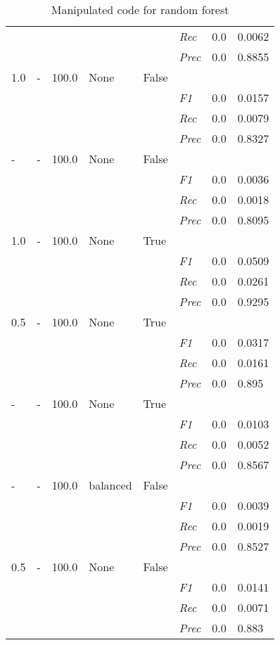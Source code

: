 \begin{table}[]
\begin{tabularx}{\textwidth}{XXXXX|X|X|X}
    & & & & & \textit{Rec} &  0.0 & 0.0062    \\
    & & & & & \textit{Prec} & 0.0 & 0.8855  \\ \midrule
    1.0 & - & 100.0 & None & False & &  \\
    & & & & & \textit{F1} & 0.0 & 0.0157        \\
    & & & & & \textit{Rec} &  0.0 & 0.0079    \\
    & & & & & \textit{Prec} & 0.0 & 0.8327  \\ \midrule
    - & - & 100.0 & None & False & &  \\
    & & & & & \textit{F1} & 0.0 & 0.0036        \\
    & & & & & \textit{Rec} &  0.0 & 0.0018    \\
    & & & & & \textit{Prec} & 0.0 & 0.8095  \\ \midrule
    1.0 & - & 100.0 & None & True & &  \\
    & & & & & \textit{F1} & 0.0 & 0.0509        \\
    & & & & & \textit{Rec} &  0.0 & 0.0261    \\
    & & & & & \textit{Prec} & 0.0 & 0.9295  \\ \midrule
    0.5 & - & 100.0 & None & True & &  \\
    & & & & & \textit{F1} & 0.0 & 0.0317        \\
    & & & & & \textit{Rec} &  0.0 & 0.0161    \\
    & & & & & \textit{Prec} & 0.0 & 0.895  \\ \midrule
    - & - & 100.0 & None & True & &  \\
    & & & & & \textit{F1} & 0.0 & 0.0103        \\
    & & & & & \textit{Rec} &  0.0 & 0.0052    \\
    & & & & & \textit{Prec} & 0.0 & 0.8567  \\ \midrule
    - & - & 100.0 & balanced & False & &  \\
    & & & & & \textit{F1} & 0.0 & 0.0039        \\
    & & & & & \textit{Rec} &  0.0 & 0.0019    \\
    & & & & & \textit{Prec} & 0.0 & 0.8527  \\ \midrule
    0.5 & - & 100.0 & None & False & &  \\
    & & & & & \textit{F1} & 0.0 & 0.0141        \\
    & & & & & \textit{Rec} &  0.0 & 0.0071    \\
    & & & & & \textit{Prec} & 0.0 & 0.883  \\ \midrule
    \end{tabularx}
    \caption{Manipulated code for random forest}
    \label{tab:rq3_random_forest}
    \end{table}
    
